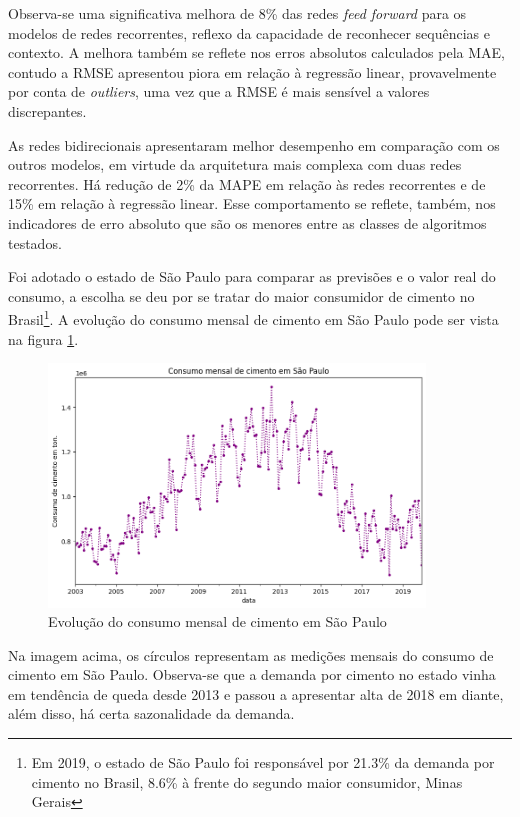Observa-se uma significativa melhora de 8\% das redes \textit{feed forward} para os modelos
de redes recorrentes, reflexo da capacidade de reconhecer sequências e contexto.
A melhora também se reflete nos erros absolutos calculados pela MAE, contudo a 
RMSE apresentou piora em relação à regressão linear, provavelmente por conta 
de \textit{outliers}, uma vez que a RMSE é mais sensível a valores discrepantes.

As redes bidirecionais apresentaram melhor desempenho em comparação com os outros 
modelos, em virtude da arquitetura mais complexa com duas redes recorrentes. Há 
redução de 2\% da MAPE em relação às redes recorrentes e de 15\% em relação à 
regressão linear. Esse comportamento se reflete, também, nos indicadores de 
erro absoluto que são os menores entre as classes de algoritmos testados.

Foi adotado o estado de São Paulo para comparar as previsões  e o valor real 
do consumo, a escolha se deu por 
se tratar do maior consumidor de cimento no Brasil\footnote{Em 2019, o estado 
de São Paulo foi 
responsável por 21.3\% da demanda por cimento no Brasil, 8.6\% à frente do 
segundo maior consumidor, Minas Gerais}. A evolução do consumo 
mensal de cimento em São Paulo pode ser vista na figura \ref{consumo-sp}.

\begin{figure}[H]
    \centering
    \includegraphics[width=10cm]{../figuras/graficos/evolucao-consumo-sp.png}
    \caption{Evolução do consumo mensal de cimento em São Paulo}
    \label{consumo-sp}
\end{figure}

Na imagem acima, os círculos representam as medições mensais do consumo de 
cimento em São Paulo. Observa-se que a demanda por cimento no estado vinha em tendência
de queda desde 2013 e passou a apresentar alta de 2018 em diante, além disso, há certa
sazonalidade da demanda.


